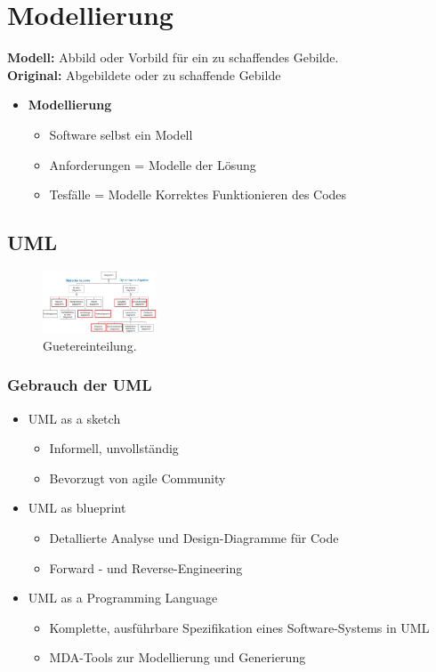 \documentclass{article}
\begin{document}
\section{Modellierung}

\textbf{Modell: } Abbild oder Vorbild für ein zu schaffendes  Gebilde.\\
\textbf{Original: } Abgebildete oder zu schaffende Gebilde \\

\begin{itemize} 
    \item \textbf{Modellierung} 
    \begin{itemize}
        \item Software selbst ein Modell
        \item Anforderungen = Modelle der Lösung
        \item Tesfälle = Modelle Korrektes Funktionieren des Codes
    \end{itemize}

\end{itemize}

\subsection{UML}

\begin{figure}[H]
\centering
\includegraphics[width=0.3\textwidth]{Resources/Images/UML_Diagramme.png}
\caption{\label{fig:Guetereinteilung}Guetereinteilung.}
\end{figure}

\subsubsection{Gebrauch der UML}
\begin{itemize}
	\item UML as a sketch
	\begin{itemize}
		\item Informell, unvollständig
		\item Bevorzugt von agile Community
	\end{itemize}
	\item UML as blueprint
	\begin{itemize}
		\item Detallierte Analyse und Design-Diagramme für Code  
		\item Forward - und Reverse-Engineering
	\end{itemize}
	\item UML as a Programming Language
	\begin{itemize}
		\item Komplette, ausführbare Spezifikation eines Software-Systems in UML
		\item MDA-Tools zur Modellierung und Generierung
	\end{itemize}

\end{itemize}
\end{document}
